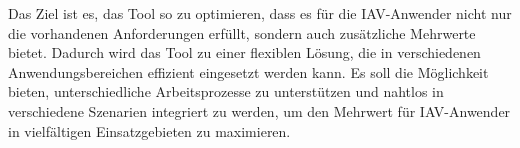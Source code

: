 \newline
Das Ziel ist es, das Tool so zu optimieren, dass es für die IAV-Anwender nicht nur die vorhandenen Anforderungen erfüllt, sondern auch zusätzliche Mehrwerte bietet. Dadurch wird das Tool zu einer flexiblen Lösung, die in verschiedenen Anwendungsbereichen effizient eingesetzt werden kann. Es soll die Möglichkeit bieten, unterschiedliche Arbeitsprozesse zu unterstützen und nahtlos in verschiedene Szenarien integriert zu werden, um den Mehrwert für IAV-Anwender in vielfältigen Einsatzgebieten zu maximieren.
\label{chap:kapitel2}


